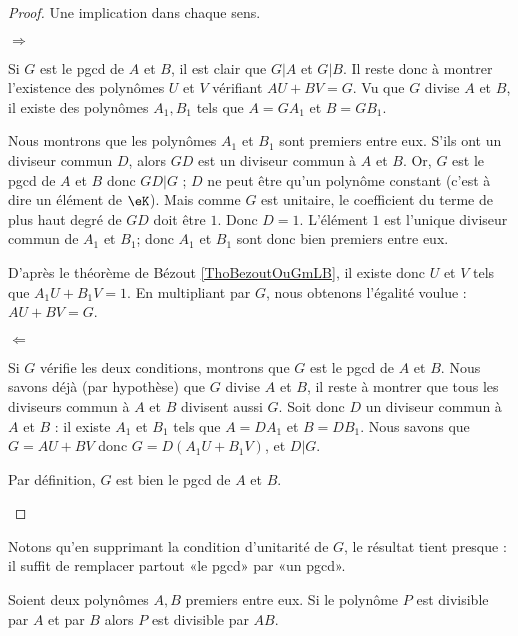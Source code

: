 \begin{proof}
    Une implication dans chaque sens.

    \begin{subproof}
        \item[\( \Rightarrow\)]

        Si $G$ est le pgcd de $A$ et $B$, il est clair que $G|A$ et $G|B$.  Il reste donc à montrer l'existence des polynômes $U$ et $V$ vérifiant $AU+BV=G$. Vu que \( G\) divise \( A\) et \( B\), il existe des polynômes $A_1,B_1$ tels que $A=GA_1$ et $B=GB_1$.

        Nous montrons que les polynômes $A_1$ et $B_1$ sont premiers entre eux. S'ils ont un diviseur commun $D$, alors $GD$ est un diviseur commun à $A$ et $B$.  Or, $G$ est le pgcd de $A$ et $B$ donc $GD|G$ ; $D$ ne peut être qu'un polynôme constant (c'est à dire un élément de \( \eK\)). Mais comme \( G\) est unitaire, le coefficient du terme de plus haut degré de \( GD\) doit être \( 1\). Donc \( D=1\).  L'élément \( 1\) est l'unique diviseur commun de \( A_1\) et \( B_1\); donc $A_1$ et $B_1$ sont donc bien premiers entre eux.

        D'après le théorème de Bézout \ref{ThoBezoutOuGmLB}, il existe donc $U$ et $V$ tels que $A_1U+B_1V=1$. En multipliant par $G$, nous obtenons l'égalité voulue : $AU+BV=G$.

        \item[\( \Leftarrow\)]

        Si $G$ vérifie les deux conditions, montrons que $G$ est le pgcd de $A$ et $B$. Nous savons déjà (par hypothèse) que $G$ divise $A$ et $B$, il reste à montrer que tous les diviseurs commun à $A$ et $B$ divisent aussi $G$. Soit donc $D$ un diviseur commun à $A$ et $B$ : il existe $A_1$ et $B_1$ tels que $A=DA_1$ et $B=DB_1$. Nous savons que $G=AU+BV$ donc $G=D(A_1U+B_1V)$, et $D|G$.

        Par définition, $G$ est bien le pgcd de $A$ et $B$.
        \end{subproof}
\end{proof}
Notons qu'en supprimant la condition d'unitarité de \( G\), le résultat tient presque : il suffit de remplacer partout «le pgcd» par «un pgcd».

\begin{lemma}       \label{LEMooGNAMooXRpgBn}
Soient deux polynômes $A,B$ premiers entre eux. Si le polynôme \( P\) est divisible par $A$ et par $B$ alors $P$ est divisible par $AB$.
\end{lemma}

